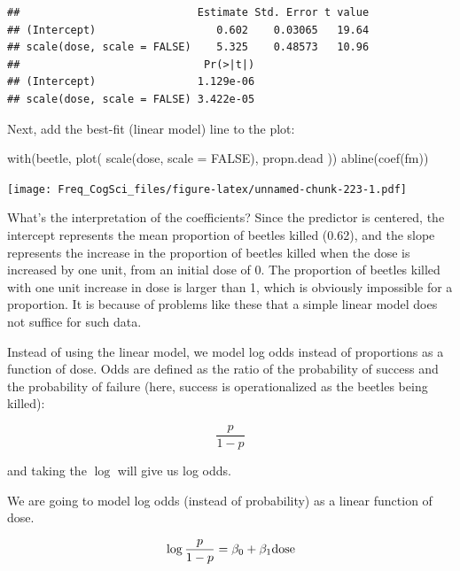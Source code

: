 \documentclass[
  12pt,
]{krantz}
\newenvironment{Shaded}{\begin{snugshade}}{\end{snugshade}}
\newcommand{\AttributeTok}[1]{\textcolor[rgb]{0.77,0.63,0.00}{#1}}
\newcommand{\ConstantTok}[1]{\textcolor[rgb]{0.00,0.00,0.00}{#1}}
\newcommand{\FunctionTok}[1]{\textcolor[rgb]{0.00,0.00,0.00}{#1}}
\newcommand{\NormalTok}[1]{#1}
\theoremstyle{definition}
\theoremstyle{definition}
\theoremstyle{definition}
\theoremstyle{definition}
\theoremstyle{remark}
\begin{document}
\begin{verbatim}
##                            Estimate Std. Error t value
## (Intercept)                   0.602    0.03065   19.64
## scale(dose, scale = FALSE)    5.325    0.48573   10.96
##                             Pr(>|t|)
## (Intercept)                1.129e-06
## scale(dose, scale = FALSE) 3.422e-05
\end{verbatim}

Next, add the best-fit (linear model) line to the plot:

\begin{Shaded}
\begin{Highlighting}[]
\FunctionTok{with}\NormalTok{(beetle, }\FunctionTok{plot}\NormalTok{(}
  \FunctionTok{scale}\NormalTok{(dose, }\AttributeTok{scale =} \ConstantTok{FALSE}\NormalTok{),}
\NormalTok{  propn.dead}
\NormalTok{))}
\FunctionTok{abline}\NormalTok{(}\FunctionTok{coef}\NormalTok{(fm))}
\end{Highlighting}
\end{Shaded}

\texttt{[image: Freq\_CogSci\_files/figure-latex/unnamed-chunk-223-1.pdf]}

What's the interpretation of the coefficients? Since the predictor is centered, the intercept represents the mean proportion of beetles killed (0.62), and the slope represents the increase in the proportion of beetles killed when the dose is increased by one unit, from an initial dose of 0. The proportion of beetles killed with one unit increase in dose is larger than 1, which is obviously impossible for a proportion. It is because of problems like these that a simple linear model does not suffice for such data.

Instead of using the linear model, we model log odds instead of proportions as a function of dose. Odds are defined as the ratio of the probability of success and the probability of failure (here, success is operationalized as the beetles being killed):

\begin{equation}
\frac{p}{1-p}
\end{equation}

and taking the \(\log\) will give us log odds.

We are going to model log odds (instead of probability) as a linear function of dose.

\begin{equation}
\log \frac{p}{1-p} = \beta_0 + \beta_1 \hbox{dose}
\end{equation}
\end{document}
